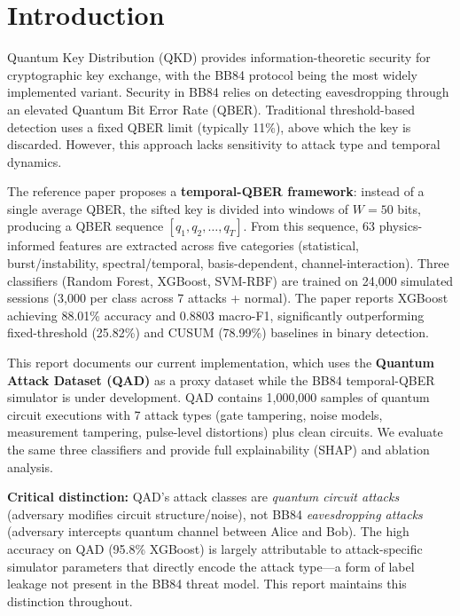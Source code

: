 \section{Introduction}
\label{sec:introduction}

Quantum Key Distribution (QKD) provides information-theoretic security for cryptographic key exchange, with the BB84 protocol being the most widely implemented variant. Security in BB84 relies on detecting eavesdropping through an elevated Quantum Bit Error Rate (QBER). Traditional threshold-based detection uses a fixed QBER limit (typically 11\%), above which the key is discarded. However, this approach lacks sensitivity to attack type and temporal dynamics.

The reference paper proposes a \textbf{temporal-QBER framework}: instead of a single average QBER, the sifted key is divided into windows of $W=50$ bits, producing a QBER sequence $[q_1, q_2, \ldots, q_T]$. From this sequence, 63 physics-informed features are extracted across five categories (statistical, burst/instability, spectral/temporal, basis-dependent, channel-interaction). Three classifiers (Random Forest, XGBoost, SVM-RBF) are trained on 24,000 simulated sessions (3,000 per class across 7 attacks + normal). The paper reports XGBoost achieving 88.01\% accuracy and 0.8803 macro-F1, significantly outperforming fixed-threshold (25.82\%) and CUSUM (78.99\%) baselines in binary detection.

This report documents our current implementation, which uses the \textbf{Quantum Attack Dataset (QAD)} as a proxy dataset while the BB84 temporal-QBER simulator is under development. QAD contains 1,000,000 samples of quantum circuit executions with 7 attack types (gate tampering, noise models, measurement tampering, pulse-level distortions) plus clean circuits. We evaluate the same three classifiers and provide full explainability (SHAP) and ablation analysis.

\textbf{Critical distinction:} QAD's attack classes are \textit{quantum circuit attacks} (adversary modifies circuit structure/noise), not BB84 \textit{eavesdropping attacks} (adversary intercepts quantum channel between Alice and Bob). The high accuracy on QAD (95.8\% XGBoost) is largely attributable to attack-specific simulator parameters that directly encode the attack type---a form of label leakage not present in the BB84 threat model. This report maintains this distinction throughout.

